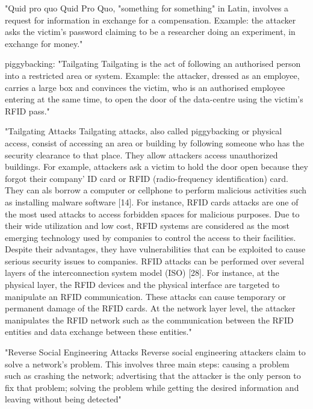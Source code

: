 "Quid pro quo
Quid Pro Quo, "something for something" in Latin, involves a request for information in exchange for a compensation.
Example: the attacker asks the victim's password claiming to be a researcher doing an experiment, in exchange for money."\cite{1_enisa}

piggybacking:
"Tailgating
Tailgating is the act of following an authorised person into a restricted area or system.
Example: the attacker, dressed as an employee, carries a large box and convinces the victim, who is an authorised employee
entering at the same time, to open the door of the data-centre using the victim's RFID pass."\cite{1_enisa}

"Tailgating Attacks
Tailgating attacks, also called piggybacking or physical access, consist of accessing an area or building by following someone
who has the security clearance to that place. They allow attackers access unauthorized buildings. For example, attackers ask a
victim to hold the door open because they forgot their company’ ID card or RFID (radio-frequency identification) card. They can als
borrow a computer or cellphone to perform malicious activities such as installing malware software [14].
For instance, RFID cards attacks are one of the most used attacks to access forbidden spaces for malicious purposes. Due to their
wide utilization and low cost, RFID systems are considered as the most emerging technology used by companies to control the access to
their facilities. Despite their advantages, they have vulnerabilities that can be exploited to cause serious security issues to companies.
RFID attacks can be performed over several layers of the interconnection system model (ISO) [28]. For instance, at the physical layer, the
RFID devices and the physical interface are targeted to manipulate an RFID communication. These attacks can cause temporary or permanent damage
of the RFID cards. At the network layer level, the attacker manipulates the RFID network such as the communication between the RFID entities and
data exchange between these entities."\cite{4_mdpi}

"Reverse Social Engineering Attacks
Reverse social engineering attackers claim to solve a network’s problem. This involves three main steps: causing a problem such as crashing the network;
advertising that the attacker is the only person to fix that problem; solving the problem while getting the desired information and leaving without being detected"\cite{4_mdpi}

